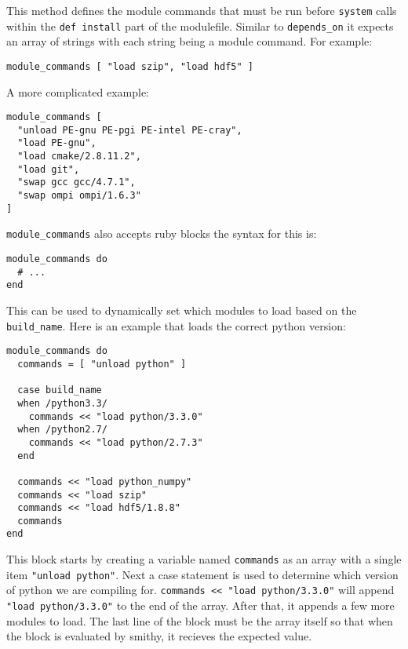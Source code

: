 \documentclass{acm_proc_article-sp}
\begin{document}
This method defines the module commands that must be run before \texttt{system}
calls within the \texttt{def install} part of the modulefile. Similar to
\texttt{depends\_on} it expects an array of strings with each string being a
module command. For example:

\begin{quoting}
\begin{verbatim}
module_commands [ "load szip", "load hdf5" ]
\end{verbatim}
\end{quoting}

A more complicated example:

\begin{quoting}
\begin{verbatim}
module_commands [
  "unload PE-gnu PE-pgi PE-intel PE-cray",
  "load PE-gnu",
  "load cmake/2.8.11.2",
  "load git",
  "swap gcc gcc/4.7.1",
  "swap ompi ompi/1.6.3"
]
\end{verbatim}
\end{quoting}

\texttt{module\_commands} also accepts ruby blocks the syntax for this is:

\begin{quoting}
\begin{verbatim}
module_commands do
  # ...
end
\end{verbatim}
\end{quoting}

This can be used to dynamically set which modules to load based on the
\texttt{build\_name}. Here is an example that loads the correct python version:

\begin{quoting}
\begin{verbatim}
module_commands do
  commands = [ "unload python" ]

  case build_name
  when /python3.3/
    commands << "load python/3.3.0"
  when /python2.7/
    commands << "load python/2.7.3"
  end

  commands << "load python_numpy"
  commands << "load szip"
  commands << "load hdf5/1.8.8"
  commands
end
\end{verbatim}
\end{quoting}

This block starts by creating a variable named \texttt{commands} as an array with a
single item \texttt{"unload python"}. Next a case statement is used to determine which
version of python we are compiling for. \texttt{commands << "load python/3.3.0"} will
append \texttt{"load python/3.3.0"} to the end of the array.  After that, it appends a
few more modules to load.  The last line of the block must be the array itself
so that when the block is evaluated by smithy, it recieves the expected value.
\end{document}
